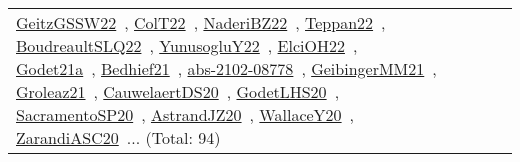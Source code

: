 {\begin{longtable}{lp{3cm}>{\raggedright\arraybackslash}p{6cm}>{\raggedright\arraybackslash}p{6cm}>{\raggedright\arraybackslash}p{8cm}}
\href{../works/GeitzGSSW22.pdf}{GeitzGSSW22}~\cite{GeitzGSSW22}, \href{../works/ColT22.pdf}{ColT22}~\cite{ColT22}, \href{../works/NaderiBZ22.pdf}{NaderiBZ22}~\cite{NaderiBZ22}, \href{../works/Teppan22.pdf}{Teppan22}~\cite{Teppan22}, \href{../works/BoudreaultSLQ22.pdf}{BoudreaultSLQ22}~\cite{BoudreaultSLQ22}, \href{../works/YunusogluY22.pdf}{YunusogluY22}~\cite{YunusogluY22}, \href{../works/ElciOH22.pdf}{ElciOH22}~\cite{ElciOH22}, \href{../works/Godet21a.pdf}{Godet21a}~\cite{Godet21a}, \href{../works/Bedhief21.pdf}{Bedhief21}~\cite{Bedhief21}, \href{../works/abs-2102-08778.pdf}{abs-2102-08778}~\cite{abs-2102-08778}, \href{../works/GeibingerMM21.pdf}{GeibingerMM21}~\cite{GeibingerMM21}, \href{../works/Groleaz21.pdf}{Groleaz21}~\cite{Groleaz21}, \href{../works/CauwelaertDS20.pdf}{CauwelaertDS20}~\cite{CauwelaertDS20}, \href{../works/GodetLHS20.pdf}{GodetLHS20}~\cite{GodetLHS20}, \href{../works/SacramentoSP20.pdf}{SacramentoSP20}~\cite{SacramentoSP20}, \href{../works/AstrandJZ20.pdf}{AstrandJZ20}~\cite{AstrandJZ20}, \href{../works/WallaceY20.pdf}{WallaceY20}~\cite{WallaceY20}, \href{../works/ZarandiASC20.pdf}{ZarandiASC20}~\cite{ZarandiASC20}... (Total: 94)\\

\end{longtable}}
